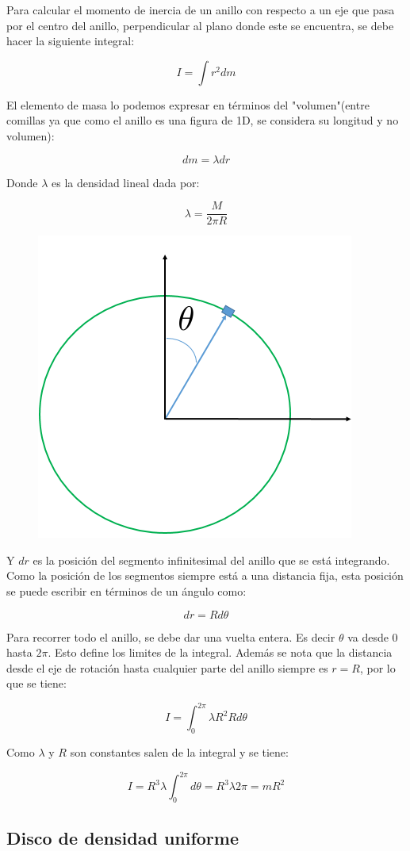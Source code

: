 \documentclass[a4paper,11pt]{article}
\theoremstyle{mytheor}
\begin{document}
Para calcular el momento de inercia de un anillo con respecto a un eje que pasa por el centro del anillo, perpendicular al plano donde este se encuentra, se debe hacer la siguiente integral:

$$ I = \int r^2 dm$$

El elemento de masa lo podemos expresar en términos del "volumen"(entre comillas ya que como el anillo es una figura de 1D, se considera su longitud y no volumen):

$$ dm = \lambda dr $$

Donde $\lambda$ es la densidad lineal dada por:

$$ \lambda = \frac{M}{2 \pi R } $$

\begin{figure}[hh]
	\includegraphics[width=0.4\linewidth]{anillo2}
	\label{fcN4}
\end{figure}

Y $dr$ es la posición del segmento infinitesimal del anillo que se está integrando. Como la posición de los segmentos siempre está a una distancia fija, esta posición se puede escribir en términos de un ángulo como:

$$ dr = R d\theta$$

Para recorrer todo el anillo, se debe dar una vuelta entera. Es decir $\theta$ va desde 0 hasta $2\pi$. Esto define los limites de la integral. Además se nota que la distancia desde el eje de rotación hasta cualquier parte del anillo siempre es $r=R$, por lo que se tiene:


$$ I = \int^{2\pi}_{0} \lambda  R^2 R d\theta$$

Como $\lambda$ y $R$ son constantes salen de la integral y se tiene:

$$ I = R^3 \lambda \int_{0}^{2\pi} d\theta = R^3 \lambda 2\pi = m R^2 $$

\subsection{Disco de densidad uniforme}
\end{document}
